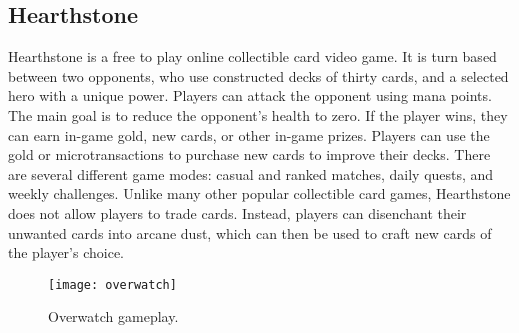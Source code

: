 \subsection{Hearthstone}
Hearthstone is a free to play online collectible card video game. It is turn based between two opponents, who use constructed decks of thirty cards, and a selected hero with a unique power. \cite{Hearthstone} Players can attack the opponent using mana points. The main goal is to reduce the opponent's health to zero. If the player wins, they can earn in-game gold, new cards, or other in-game prizes. Players can use the gold or microtransactions to purchase new cards to improve their decks. There are several different game modes: casual and ranked matches, daily quests, and weekly challenges. Unlike many other popular collectible card games, Hearthstone does not allow players to trade cards. Instead, players can disenchant their unwanted cards into arcane dust, which can then be used to craft new cards of the player's choice. 

\begin{figure}[h]
\centering
\texttt{[image: overwatch]}
\caption{Overwatch gameplay.}
\end{figure}
